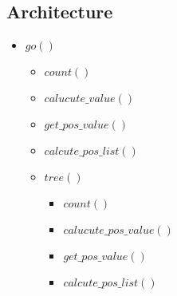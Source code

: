 \documentclass[conference,compsoc]{IEEEtran}
\begin{document}
\subsection{Architecture}
\begin{itemize}
  \item $go()$
  \begin{itemize}
    \item $count()$
    \item $calucute\_value()$
    \item $get\_pos\_value()$
    \item $calcute\_pos\_list()$
    \item $tree()$
    \begin{itemize}
      \item $count()$
      \item $calucute\_pos\_value()$
      \item $get\_pos\_value()$ 
      \item $calcute\_pos\_list()$
    \end{itemize}
  \end{itemize}
\end{itemize}
\end{document}

